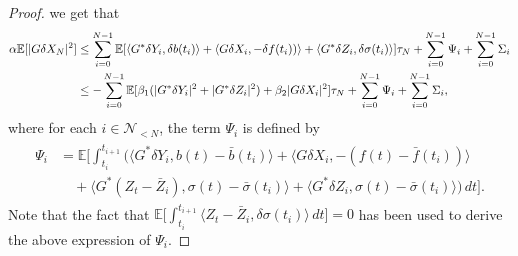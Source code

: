 \documentclass[11pt]{article}
\numberwithin{equation}{section}
\theoremstyle{definition}
\theoremstyle{remark}
\def\l{\label}  \def\f{\frac}  \def\fa{\forall}
\def\b{\beta}  \def\a{\alpha} \def\ga{\gamma}
\def \la{\langle} \def\ra{\rangle}
\def\cN{\mathcal{N}}
\def\sE{{\mathbb{E}}}
\begin{document}
\begin{proof}
we get that 
\begin{align}
\a\sE[| G\delta X_N|^2]
&\le
\sum_{i=0}^{N-1}
\sE[ 
\la G^*\delta Y_{i},
\delta {b}(t_{i})\ra 
+
\la G\delta X_{i},-\delta {f}(t_{i}))\ra
+\la G^*\delta Z_i, \delta {\sigma}(t_i)
\ra
 ]\tau_N
+\sum_{i=0}^{N-1}\Psi_i
+\sum_{i=0}^{N-1}{\Sigma_i}
\nb\\
&\le
-\sum_{i=0}^{N-1}
\sE[ 
\b_1 
(| G^*\delta Y_{i}|^2
 +
|G^*\delta Z_i|^2)
+
\b_2|G\delta X_{i}|^2
]\tau_N
+\sum_{i=0}^{N-1}\Psi_i
+\sum_{i=0}^{N-1}{\Sigma_i},
\l{eq:DeltaGXYZ_N_conts}
\end{align}
where for each $i\in \cN_{<N}$, the term $\Psi_i$ is defined by
\begin{align}\l{eq:Psi_i_conts}
\begin{split}
{\Psi_i}
&=
\sE\bigg[ \int_{t_i}^{t_{i+1}}
\bigg(\la G^*\delta Y_{i},
b(t)-\bar{b}(t_{i})\ra 
+
\la G\delta X_{i},-(f(t)-\bar{f}(t_{i}))\ra
\\
&\quad
+\la G^*({Z}_t-\bar{Z}_i), \sigma(t)-\bar{\sigma}(t_i)
\ra
+\la G^*\delta Z_i, \sigma(t)-\bar{\sigma}(t_i)
\ra
\bigg) \,dt\bigg].
\end{split}
\end{align}
Note that the fact that 
$\sE \big[\int_{t_i}^{t_{i+1}} \la {Z}_t-\bar{Z}_i, \delta \sigma (t_i)
\ra \,dt\big]=0$
has been used 
 to derive the above expression of $\Psi_i$.


\end{proof}
\end{document}
